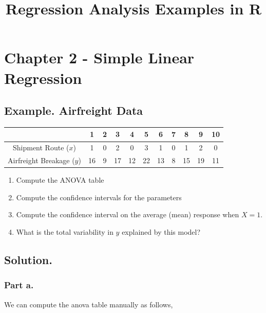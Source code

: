 \documentclass[
  11pt,
]{article}
\title{Regression Analysis Examples in R}
\author{}
\date{\vspace{-2.5em}}
\providecommand{\tightlist}{%
  \setlength{\itemsep}{0pt}\setlength{\parskip}{0pt}}
\begin{document}
\maketitle

\section{Chapter 2 - Simple Linear
Regression}\label{chapter-2---simple-linear-regression}

\subsection{Example. Airfreight Data}\label{example.-airfreight-data}

\begin{center}
    \begin{tabular}{|c|c|c|c|c|c|c|c|c|c|c|}
        \hline
        & 1 & 2 & 3 & 4 & 5 & 6 & 7 & 8 & 9 & 10\\
        \hline
        Shipment Route ($x$) & 1 & 0 & 2 & 0 & 3 & 1 & 0 & 1 & 2 & 0\\
        Airfreight Breakage ($y$) & 16 & 9 & 17 & 12 & 22 & 13 & 8 & 15 & 19 & 11\\
        \hline
    \end{tabular}
\end{center}

\begin{enumerate}
\def\labelenumi{\alph{enumi})}
\tightlist
\item
  Compute the ANOVA table
\item
  Compute the confidence intervals for the parameters
\item
  Compute the confidence interval on the average (mean) response when
  \(X = 1\).
\item
  What is the total variability in \(y\) explained by this model?
\end{enumerate}

\subsection{Solution.}\label{solution.}

\subsubsection{Part a.}\label{part-a.}

We can compute the anova table manually as follows,
\end{document}
